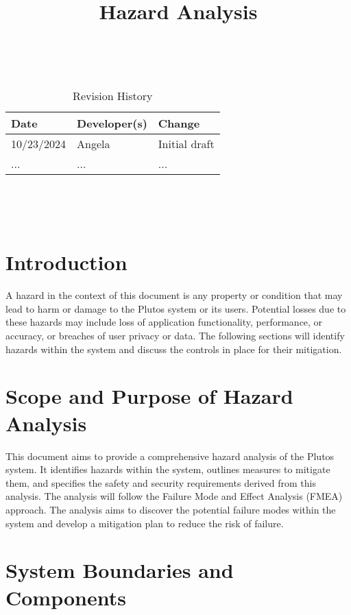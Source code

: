 \documentclass{article}
\title{Hazard Analysis\\\progname}
\author{\authname}
\date{}
\begin{document}
\maketitle
\thispagestyle{empty}

~\newpage


\begin{table}[hp]
\caption{Revision History} \label{TblRevisionHistory}
\begin{tabularx}{\textwidth}{llX}
\toprule
\textbf{Date} & \textbf{Developer(s)} & \textbf{Change}\\
\midrule
10/23/2024 & Angela & Initial draft\\
... & ... & ...\\
\bottomrule
\end{tabularx}
\end{table}

~\newpage

\tableofcontents

~\newpage


\section{Introduction}

A hazard in the context of this document is any property or condition that may
lead to harm or damage to the Plutos system or its users. Potential losses due
to these hazards may include loss of application functionality, performance, or
accuracy, or breaches of user privacy or data. The following sections will
identify hazards within the system and discuss the controls in place for their
mitigation.


\section{Scope and Purpose of Hazard Analysis}

This document aims to provide a comprehensive hazard analysis of the Plutos
system. It identifies hazards within the system, outlines measures to mitigate
them, and specifies the safety and security requirements derived from this
analysis. The analysis will follow the Failure Mode and Effect Analysis (FMEA)
approach. The analysis aims to discover the potential failure modes within the
system and develop a mitigation plan to reduce the risk of failure. 


\section{System Boundaries and Components}
\end{document}

